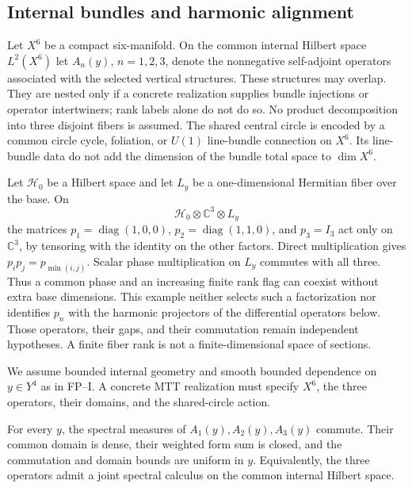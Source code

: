 \documentclass[11pt]{article}
\newcommand{\Yfour}{\ensuremath{Y^{4}}}
\newcommand{\Xsix}{\ensuremath{X^{6}}}
\begin{document}
\subsection{Internal bundles and harmonic alignment}
Let $\Xsix$ be a compact six-manifold. On the common internal Hilbert space
$L^2(\Xsix)$ let $A_n(y)$, $n=1,2,3$, denote the nonnegative self-adjoint
operators associated with the selected vertical structures. These structures
may overlap. They are nested only if a concrete realization supplies bundle
injections or operator intertwiners; rank labels alone do not do so. No product
decomposition into three disjoint fibers is assumed. The shared central circle
is encoded by a common circle cycle, foliation, or $U(1)$ line-bundle
connection on $\Xsix$. Its line-bundle data do not add the dimension of the
bundle total space to $\dim\Xsix$.

\begin{remark}
Let $\mathcal H_0$ be a Hilbert space and let $L_y$ be a one-dimensional
Hermitian fiber over the base. On
\[
\mathcal H_0\otimes\mathbb C^3\otimes L_y
\]
the matrices
$p_1=\operatorname{diag}(1,0,0)$,
$p_2=\operatorname{diag}(1,1,0)$, and $p_3=I_3$ act only on
$\mathbb C^3$, by tensoring with the identity on the other factors.
Direct multiplication gives $p_ip_j=p_{\min(i,j)}$. Scalar phase
multiplication on $L_y$ commutes with all three. Thus a common phase and
an increasing finite rank flag can coexist without extra base dimensions.
This example neither selects such a factorization nor identifies $p_n$ with
the harmonic projectors of the differential operators below. Those operators,
their gaps, and their commutation remain independent hypotheses. A finite
fiber rank is not a finite-dimensional space of sections.
\end{remark}

We assume bounded internal geometry and smooth bounded dependence on
$y\in\Yfour$ as in FP--I. A concrete MTT realization must specify $\Xsix$, the
three operators, their domains, and the shared-circle action.

\begin{assumption}\label{ass:strong-comm}
For every $y$, the spectral measures of $A_1(y),A_2(y),A_3(y)$ commute. Their
common domain is dense, their weighted form sum is closed, and the commutation
and domain bounds are uniform in $y$. Equivalently, the three operators admit a
joint spectral calculus on the common internal Hilbert space.
\end{assumption}
\end{document}

